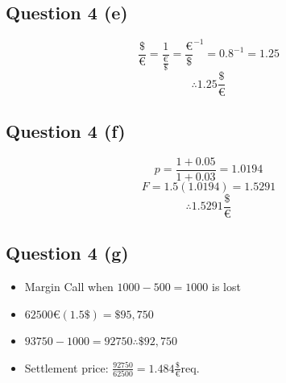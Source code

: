\documentclass[11pt, english]{article}
\begin{document}
	\subsection{Question 4 (e)}

	$$\frac{\$}{\euro}=\frac{1}{\frac{\euro}{\$}}={\frac{\euro}{\$}}^{-1}=0.8^{-1}=1.25$$
	$$\therefore1.25\frac{\$}{\euro}$$

	\subsection{Question 4 (f)}

	$$p=\frac{1+0.05}{1+0.03}=1.0194$$
	$$F=1.5(1.0194)=1.5291$$
	$$\therefore1.5291\frac{\$}{\euro}$$

	\subsection{Question 4 (g)}

	\begin{itemize}
	\setlength\itemsep{0cm}
		\item Margin Call when $1000-500=1000$ is lost
		\item $62500\euro(1.5\$)=\$95,750$
		\item $93750-1000=92750\therefore\$92,750$
		\item Settlement price: $\frac{92750}{62500}=1.484\frac{\$}{\euro}\mathrm{req.}$
	\end{itemize}
\end{document}
